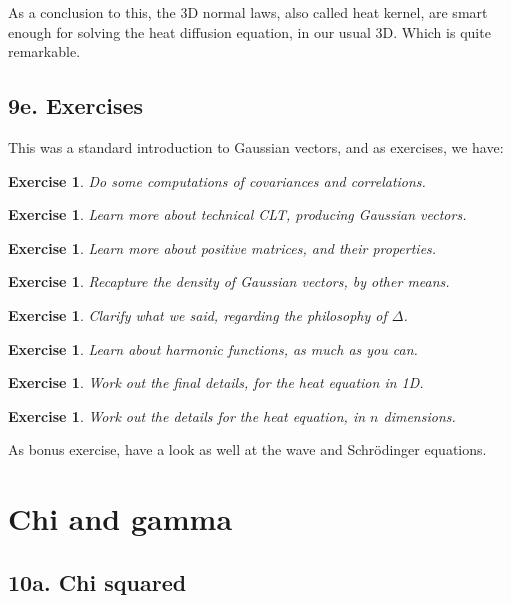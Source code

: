 \documentclass[12pt]{amsbook}
\newtheorem{exercise}[theorem]{Exercise}
\begin{document}
As a conclusion to this, the 3D normal laws, also called heat kernel, are smart enough for solving the heat diffusion equation, in our usual 3D. Which is quite remarkable.

\section*{9e. Exercises}

This was a standard introduction to Gaussian vectors, and as exercises, we have:

\begin{exercise}
Do some computations of covariances and correlations.
\end{exercise}

\begin{exercise}
Learn more about technical CLT, producing Gaussian vectors.
\end{exercise}

\begin{exercise}
Learn more about positive matrices, and their properties.
\end{exercise}

\begin{exercise}
Recapture the density of Gaussian vectors, by other means.
\end{exercise}

\begin{exercise}
Clarify what we said, regarding the philosophy of $\Delta$.
\end{exercise}

\begin{exercise}
Learn about harmonic functions, as much as you can.
\end{exercise}

\begin{exercise}
Work out the final details, for the heat equation in 1D.
\end{exercise}

\begin{exercise}
Work out the details for the heat equation, in $n$ dimensions.
\end{exercise}

As bonus exercise, have a look as well at the wave and Schr\"odinger equations.

\chapter{Chi and gamma}

\section*{10a. Chi squared}
\end{document}
